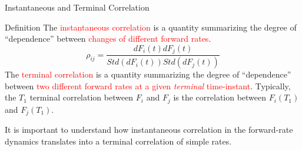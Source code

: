 \documentclass{beamer}
\begin{document}
\begin{frame}{Instantaneous and Terminal Correlation}
	
	\begin{block}{Definition}
		The \textcolor{red}{instantaneous correlation} is a quantity summarizing the degree of “dependence” between \textcolor{red}{changes of different forward rates}.
		\begin{equation*}
			\rho_{ij} = \frac{dF_i(t) dF_j(t)}{Std(dF_i(t)) Std(dF_j(t))}
		\end{equation*}
		The \textcolor{red}{terminal correlation} is a quantity summarizing the degree of “dependence” between \textcolor{red}{two different forward rates at a given \emph{terminal} time-instant}. Typically, the $T_1$ terminal correlation between $F_i$ and $F_j$ is the correlation between $F_i(T_1)$ and $F_j(T_1)$.
	\end{block}
	It is important to understand how instantaneous correlation in the forward-rate dynamics translates into a terminal correlation of simple rates.
\end{frame}
\end{document}
